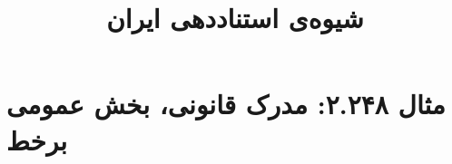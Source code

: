 \documentclass[a4paper,10pt]{article}
\begin{document}
\title{شیوه‌ی استناددهی ایران
 }
\author{}
\date{}
\maketitle



\section*{مثال ۲.۲۴۸: مدرک قانونی، بخش عمومی برخط}

\cite{شیرازی1385}\\
\cite{uscensus2000}\\






\end{document}
